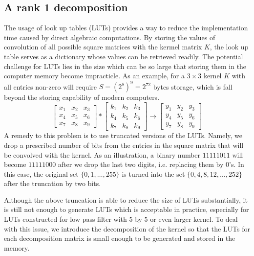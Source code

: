 \documentclass[12pt]{amsart}
\theoremstyle{definition}
\theoremstyle{remark}
\numberwithin{thm}{section}
\begin{document}
\subsection{A rank 1 decomposition}
The usage of look up tables (LUTs) provides a way to reduce the implementation time caused by direct algebraic computations. By storing the values of convolution of all possible square matrices with the kermel matrix $K$, the look up table serves as a dictionary whose values can be retrieved readily. The potential challenge for LUTs lies in the size which can be so large that storing them in the computer memory become impracticle. As an example, for a $3\times 3$ kernel $K$ with all entries non-zero will require $S=(2^8)^9=2^{72}$ bytes storage, which is fall beyond the storing capability of modern computers. 
$$
\begin{bmatrix}
x_1 & x_2 & x_3\\
x_4 & x_5 & x_6\\
x_7 & x_8 & x_9
\end{bmatrix}
*
\begin{bmatrix}
k_1 & k_2 & k_3\\
k_4 & k_5 & k_6\\
k_7 & k_8 & k_9
\end{bmatrix}
\longrightarrow
\begin{bmatrix}
y_1 & y_2 & y_3\\
y_4 & y_5 & y_6\\
y_7 & y_8 & y_9
\end{bmatrix}
$$
A remedy to this problem is to use truncated versions of the LUTs. Namely, we drop a prescribed number of bits from the entries in the square matrix that will be convolved with the kernel. As an illustration, a binary number $11111011$ will become $11111000$ after we drop the last two digits, i.e. replacing them by $0$'s. In this case, the original set $\{0,1,\dots,255\}$ is turned into the set $\{0,4,8,12,\dots,252\}$ after the truncation by two bits.

Although the above truncation is able to reduce the size of LUTs substantially, it is still not enough to generate LUTs which is acceptable in practice, especially for LUTs constructed for low pass filter with 5 by 5 or even larger kernel. To deal with this issue, we introduce the decomposition of the kernel so that the LUTs for each decomposition matrix is small enough to be generated and stored in the memory. 
\end{document}
